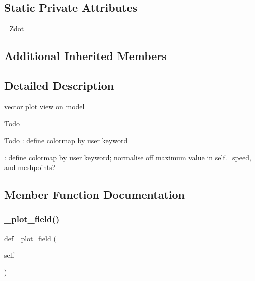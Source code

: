 \subsection*{Static Private Attributes}
\begin{DoxyCompactItemize}
\item 
\hyperlink{class_mu_mo_t_1_1_mu_mo_tvector_view_a4008c2e6651cb1bf1c9c1af3e962a25d}{\+\_\+\+Zdot}
\end{DoxyCompactItemize}
\subsection*{Additional Inherited Members}


\subsection{Detailed Description}
vector plot view on model 

\begin{DoxyRefDesc}{Todo}
\item[\hyperlink{todo__todo000001}{Todo}]\+: define colormap by user keyword 

\+: define colormap by user keyword; normalise off maximum value in self.\+\_\+speed, and meshpoints? \end{DoxyRefDesc}


\subsection{Member Function Documentation}
\mbox{\label{class_mu_mo_t_1_1_mu_mo_tvector_view_a50d59419298116f738a98c864afb9d89}} 
\subsubsection{\texorpdfstring{\+\_\+plot\+\_\+field()}{\_plot\_field()}}
{\footnotesize\ttfamily def \+\_\+plot\+\_\+field (\begin{DoxyParamCaption}\item[{}]{self }\end{DoxyParamCaption})\hspace{0.3cm}{\ttfamily [private]}}



